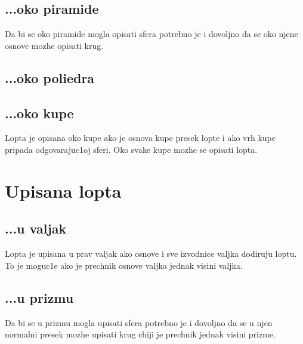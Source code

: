 \documentclass{beamer}
\begin{document}
\subsection{...oko piramide}
\begin{frame}
\begin{block}{}
Da bi se oko piramide mogla opisati sfera potrebno je i dovoljno da se oko
njene osnove mozhe opisati krug.
\end{block}
\begin{figure}[H]
    
\end{figure}
\end{frame}
\subsection{...oko poliedra}
\subsection{...oko kupe}
\begin{frame}
\begin{block}{}
Lopta je opisana oko kupe ako je osnova kupe presek lopte i ako vrh kupe
pripada odgovarajuc1oj sferi. Oko svake kupe mozhe se opisati lopta.
\end{block}
\begin{figure}[H]
    
\end{figure}
\end{frame}
\section{Upisana lopta}
\subsection{...u valjak}
\begin{frame}
\begin{block}{}
Lopta je upisana u prav valjak ako osnove i sve izvodnice valjka dodiruju
loptu. To je moguc1e ako je prechnik osnove valjka jednak visini valjka.
\end{block}
\begin{figure}[H]
    
\end{figure}
\end{frame}
\subsection{...u prizmu}
\begin{frame}
\begin{block}{}
Da bi se u prizmu mogla upisati sfera potrebno je i dovoljno da se u njen normalni presek mozhe upisati krug chiji je prechnik jednak visini prizme. 
\end{block}
\begin{figure}[H]
    
\end{figure}
\end{frame}
\end{document}
